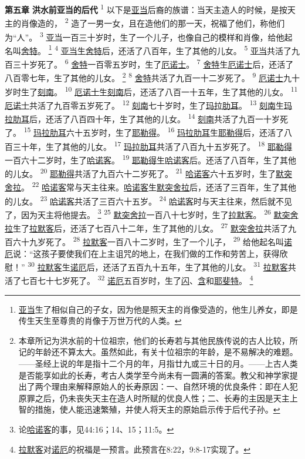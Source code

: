 \textbf{第五章 }
\textbf{洪水前亚当的后代 }
\textsuperscript{1}
以下是\uline{亚当}后裔的族谱：当天主造人的时候，是按天主的肖像造的，
\textsuperscript{2}
造了一男一女，且在造他们的那一天，祝福了他们，称他们为“人”。
\textsuperscript{3}
\uline{亚当}一百三十岁时，生了一个儿子，也像自己的模样和肖像，给他起名叫\uline{舍特}。
\footnote{\uline{亚当}生了相似自己的子女，因为他是照天主的肖像受造的，他生儿养女，即是传生天生至尊贵的肖像于万世万代的人类。}
\textsuperscript{4}
\uline{亚当}生\uline{舍特}后，还活了八百年，生了其他的儿女。
\textsuperscript{5}
\uline{亚当}共活了九百三十岁死了。
\textsuperscript{6}
\uline{舍特}一百零五岁时，生了\uline{厄诺士}。
\textsuperscript{7}
\uline{舍特}生\uline{厄诺士}后，还活了八百零七年，生了其他的儿女。
\footnote{本章所记为洪水前的十位祖宗，他们的长寿若与其他民族传说的古人比较，所记的年龄还不算太大。虽然如此，有关十位祖宗的年龄，是不易解决的难题。——圣经上说的年是指十二个月的年，月指廿九或三十日的月。——上古人类是否能享如此的长寿，考古人类学至今尚未有一圆满的答案。教父和神学家提出了两个理由来解释原始人的长寿原因：一、自然环境的优良条件：即在人犯原罪之后，仍未丧失天主在造人时所赋的优良人性；二、长寿的主因是天主上智的措施，使人能迅速繁殖，并使人将天主的原始启示传于后代子孙。}
\textsuperscript{8}
\uline{舍特}共活了九百一十二岁死了。
\textsuperscript{9}
\uline{厄诺士}九十岁时生了\uline{刻南}。
\textsuperscript{10}
\uline{厄诺士}生\uline{刻南}后，还活了八百一十五年，生了其他的儿女。
\textsuperscript{11}
\uline{厄诺士}共活了九百零五岁死了。
\textsuperscript{12}
\uline{刻南}七十岁时，生了\uline{玛拉肋耳}。
\textsuperscript{13}
\uline{刻南}生\uline{玛拉肋耳}后，还活了八百四十年，生了其他的儿女。
\textsuperscript{14}
\uline{刻南}共活了九百一十岁死了。
\textsuperscript{15}
\uline{玛拉肋耳}六十五岁时，生了\uline{耶勒得}。
\textsuperscript{16}
\uline{玛拉肋耳}生\uline{耶勒得}后，还活了八百三十年，生了其他的儿女。
\textsuperscript{17}
\uline{玛拉肋耳}共活了八百九十五岁死了。
\textsuperscript{18}
\uline{耶勒得}一百六十二岁时，生了\uline{哈诺客}。
\textsuperscript{19}
\uline{耶勒得}生\uline{哈诺客}后。还活了八百年，生了其他的儿女。
\textsuperscript{20}
\uline{耶勒得}共活了九百六十二岁死了。
\textsuperscript{21}
\uline{哈诺客}六十五岁时，生了\uline{默突舍拉}。
\textsuperscript{22}
\uline{哈诺客}常与天主往来。\uline{哈诺客}生\uline{默突舍拉}后，还活了三百年，生了其他的儿女。
\textsuperscript{23}
\uline{哈诺客}共活了三百六十五岁。
\textsuperscript{24}
\uline{哈诺客}时与天主往来，然后就不见了，因为天主将他提去。
\footnote{论\uline{哈诺客}的事，见44:16；14、15；11:5。}
\textsuperscript{25}
\uline{默突舍拉}一百八十七岁时，生了\uline{拉默客}。
\textsuperscript{26}
\uline{默突舍拉}生了\uline{拉默客}后，还活了七百八十二年，生了其他的儿女。
\textsuperscript{27}
\uline{默突舍拉}共活了九百六十九岁死了。
\textsuperscript{28}
\uline{拉默客}一百八十二岁时，生了一个儿子，
\textsuperscript{29}
给他起名叫\uline{诺厄}说：“这孩子要使我们在上主诅咒的地上，在我们做的工作和劳苦上，获得欣慰！”
\textsuperscript{30}
\uline{拉默客}生\uline{诺厄}后，还活了五百九十五年，生了其他的儿女。
\textsuperscript{31}
\uline{拉默客}共活了七百七十七岁死了。
\textsuperscript{32}
\uline{诺厄}五百岁时，生了\uline{闪}、\uline{含}和\uline{耶斐特}。
\footnote{\uline{拉默客}对\uline{诺厄}的祝福是一预言。此预言在8:22，9:8-17实现了。}

